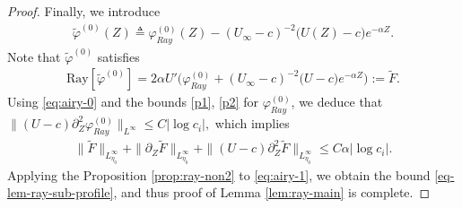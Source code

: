\documentclass[reqno,11pt]{amsart}
\numberwithin{equation}{section}
\numberwithin{equation}{section}
\theoremstyle{plain}
\begin{document}
\begin{proof}
	Finally, we introduce 
	\begin{align*}
		\tilde{\varphi}^{(0)}(Z)\triangleq\varphi_{Ray}^{(0)}(Z)-(U_\infty-c)^{-2}\big(U(Z)-c\big)e^{-\alpha Z}.
	\end{align*}
Note that $\tilde{\varphi}^{(0)}$ satisfies
	\begin{align}\label{eq:airy-1}
		\mathrm{Ray}[\tilde{\varphi}^{(0)}]=2\alpha U'\big(\varphi_{Ray}^{(0)}+(U_\infty-c)^{-2}\big(U-c\big)e^{-\alpha Z}\big):=\tilde{F}.
	\end{align}
	Using \eqref{eq:airy-0} and the bounds \eqref{p1}, \eqref{p2} for $\varphi_{Ray}^{(0)}$, we deduce that $\big\|(U-c)\partial_Z^2\varphi_{Ray}^{(0)}\big\|_{L^\infty}\leq C|\log c_i|,$ which implies
	\begin{align*}
		\|\tilde{F}\|_{L_{\eta_0}^\infty}+ \|\partial_Z\tilde{F}\|_{L_{\eta_0}^\infty}
		+\|(U-c)\partial_Z^2\tilde{F}\|_{L_{\eta_0}^\infty}\leq C\alpha |\log c_i|. 
	\end{align*}
	Applying the Proposition \ref{prop:ray-non2} to \eqref{eq:airy-1}, we obtain the bound  \eqref{eq-lem-ray-sub-profile}, and thus proof of Lemma \ref{lem:ray-main} is complete.
\end{proof}
\end{document}
